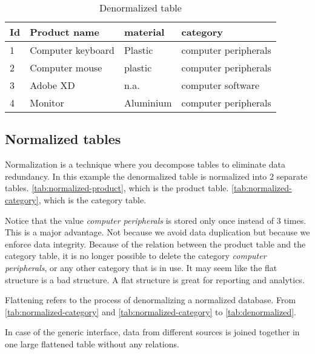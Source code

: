 \begin{table}[H]
\begin{tabular}{ | l | l | l | l |}
    \toprule
    \textbf{Id}     & \textbf{Product name} & \textbf{material}     & \textbf{category}  \\
    \midrule
    1               & Computer keyboard     & Plastic                   & computer peripherals     \\
    \midrule
    2               & Computer mouse        & plastic                   & computer peripherals      \\
    \midrule
    3               & Adobe XD              & n.a.                      & computer software         \\
    \midrule
    4               & Monitor               & Aluminium                 & computer peripherals      \\
    \bottomrule
\end{tabular}
\centering
\captionsetup{justification=centering}
\caption{Denormalized table}
\label{tab:denormalized}
\end{table}

\subsection{Normalized tables}
Normalization is a technique where you decompose tables to eliminate data redundancy. In this example the denormalized table is normalized into 2 separate tables. \autoref{tab:normalized-product}, which is the product table. \autoref{tab:normalized-category}, which is the category table.

Notice that the value \textit{computer peripherals} is stored only once instead of 3 times. This is a major advantage. Not because we avoid data duplication but because we enforce data integrity. Because of the relation between the product table and the category table, it is no longer possible to delete the category \textit{computer peripherals}, or any other category that is in use. It may seem like the flat structure is a bad structure. A flat structure is great for reporting and analytics.

Flattening refers to the process of denormalizing a normalized database. From \autoref{tab:normalized-category} and \autoref{tab:normalized-category} to \autoref{tab:denormalized}.

In case of the generic interface, data from different sources is joined together in one large flattened table without any relations.

